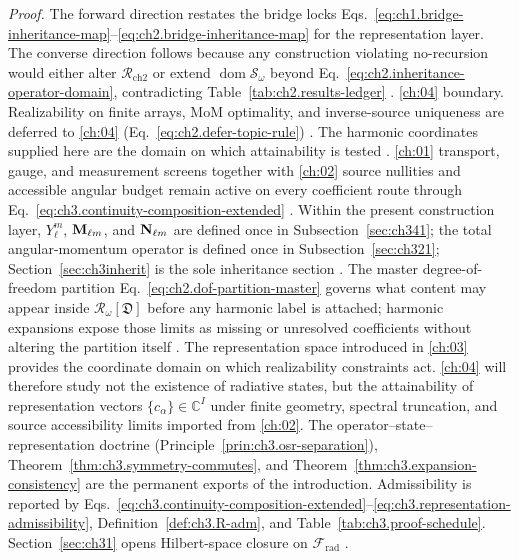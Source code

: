 \noindent\textit{Proof.}
The forward direction restates the bridge locks
Eqs.~\eqref{eq:ch1.bridge-inheritance-map}--\eqref{eq:ch2.bridge-inheritance-map} for the
representation layer. The converse direction follows because any construction violating
no-recursion would either alter \(\mathcal{R}_{\mathrm{ch2}}\) or extend
\(\operatorname{dom}\mathcal{S}_\omega\) beyond Eq.~\eqref{eq:ch2.inheritance-operator-domain},
contradicting Table~\ref{tab:ch2.results-ledger} \cite{stratton1941}.
\ref{ch:04} boundary. Realizability on finite arrays, MoM optimality, and inverse-source uniqueness are deferred to
\ref{ch:04} (Eq.~\eqref{eq:ch2.defer-topic-rule}) \cite{harrington2001}.
The harmonic coordinates supplied here are the domain on which attainability is tested
\cite{harrington2001}.
\ref{ch:01} transport, gauge, and measurement screens together with \ref{ch:02}
source nullities and accessible angular budget remain active on every coefficient route through
Eq.~\eqref{eq:ch3.continuity-composition-extended} \cite{stratton1941}.
Within the present construction layer, \(Y_\ell^m\), \(\mathbf{M}_{\ell m}\), and \(\mathbf{N}_{\ell m}\) are defined once in
Subsection~\ref{sec:ch341}; the total angular-momentum operator is defined once in
Subsection~\ref{sec:ch321}; Section~\ref{sec:ch3inherit} is the sole inheritance section
\cite{hansen1988}. The master degree-of-freedom partition
Eq.~\eqref{eq:ch2.dof-partition-master} governs what content may appear inside
\(\mathcal{R}_\omega[\mathfrak{D}]\) before any harmonic label is attached; harmonic expansions
expose those limits as missing or unresolved coefficients without altering the partition itself
\cite{harrington2001}.
The representation space introduced in \ref{ch:03} provides the coordinate
domain on which realizability constraints act. \ref{ch:04} will therefore study
not the existence of radiative states, but the attainability of representation vectors
\(\{c_\alpha\}\in\mathbb{C}^{I}\) under finite geometry, spectral truncation, and
source accessibility limits imported from \ref{ch:02}.
The operator--state--representation doctrine (Principle~\ref{prin:ch3.osr-separation}), Theorem~\ref{thm:ch3.symmetry-commutes}, and Theorem~\ref{thm:ch3.expansion-consistency} are the permanent exports of the introduction. Admissibility is reported by Eqs.~\eqref{eq:ch3.continuity-composition-extended}--\eqref{eq:ch3.representation-admissibility}, Definition~\ref{def:ch3.R-adm}, and Table~\ref{tab:ch3.proof-schedule}. Section~\ref{sec:ch31} opens Hilbert-space closure on \(\mathcal{F}_{\mathrm{rad}}\) \cite{stratton1941}.
